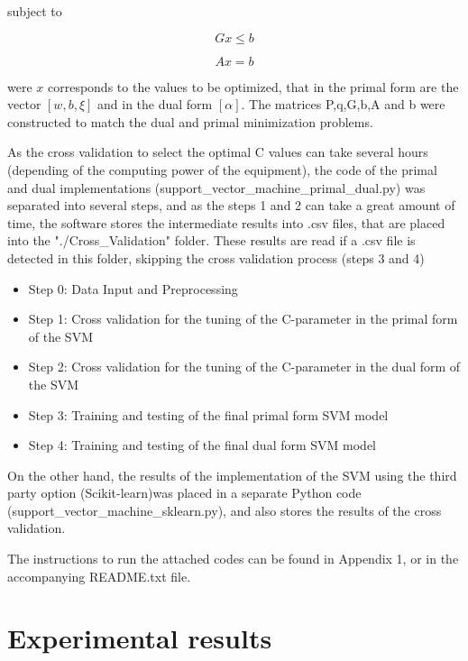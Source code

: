 \documentclass[11pt,twocolumn,letterpaper]{article}
\begin{document}
subject to 

\begin{equation}
	Gx \leq b
\end{equation}

\begin{equation}
	Ax = b
\end{equation}

were $x$ corresponds to the values to be optimized, that in the primal form are the vector $[w,b,\xi]$ and in the dual form $[\alpha]$. The matrices P,q,G,b,A and b were constructed to match the dual and primal minimization problems.

As the cross validation to select the optimal C values can take several hours (depending of the computing power of the equipment), the code of the primal and dual implementations (support\_vector\_machine\_primal\_dual.py) was separated into several steps, and as the steps 1 and 2 can take a great amount of time, the software stores the intermediate results into .csv files, that are placed into the "./Cross\_Validation" folder. These results are read if a .csv file is detected in this folder, skipping the cross validation process (steps 3 and 4)

\begin{itemize}
	\item Step 0: Data Input and Preprocessing
	\item Step 1: Cross validation for the tuning of the C-parameter in the primal form of  the SVM
	\item Step 2: Cross validation for the tuning of the C-parameter in the dual form of the SVM
	\item Step 3: Training and testing of the final primal form SVM model
	\item Step 4: Training and testing of the final dual form SVM model
\end{itemize}

On the other hand, the results of the implementation of the SVM using the third party option (Scikit-learn)was placed in a separate Python code (support\_vector\_machine\_sklearn.py), and also stores the results of the cross validation.

The instructions to run the attached codes can be found in Appendix 1, or in the accompanying README.txt file.

\section{Experimental results}
\end{document}
